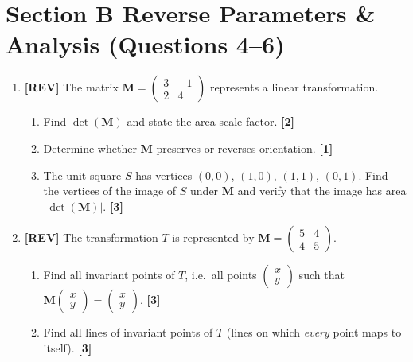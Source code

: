 \documentclass[11pt,a4paper]{article}
\begin{document}
\section*{Section B \quad Reverse Parameters \& Analysis \hfill{\normalfont\small(Questions 4--6)}}
\begin{enumerate}[resume]
\item \textbf{[REV]} The matrix $\mathbf{M} = \begin{pmatrix} 3 & -1 \\ 2 & 4 \end{pmatrix}$ represents a linear transformation.
\begin{enumerate}
  \item Find $\det(\mathbf{M})$ and state the area scale factor. \hfill{\small\textbf{[2]}}
  \item Determine whether $\mathbf{M}$ preserves or reverses orientation. \hfill{\small\textbf{[1]}}
  \item The unit square $S$ has vertices $(0,0)$, $(1,0)$, $(1,1)$, $(0,1)$. Find the vertices of the image of $S$ under $\mathbf{M}$ and verify that the image has area $|\det(\mathbf{M})|$. \hfill{\small\textbf{[3]}}
\end{enumerate}

\item \textbf{[REV]} The transformation $T$ is represented by $\mathbf{M} = \begin{pmatrix} 5 & 4 \\ 4 & 5 \end{pmatrix}$.
\begin{enumerate}
  \item Find all invariant points of $T$, i.e.\ all points $\begin{pmatrix} x \\ y \end{pmatrix}$ such that $\mathbf{M}\begin{pmatrix} x \\ y \end{pmatrix} = \begin{pmatrix} x \\ y \end{pmatrix}$. \hfill{\small\textbf{[3]}}
  \item Find all lines of invariant points of $T$ (lines on which \emph{every} point maps to itself). \hfill{\small\textbf{[3]}}
\end{enumerate}


\end{enumerate}
\end{document}
